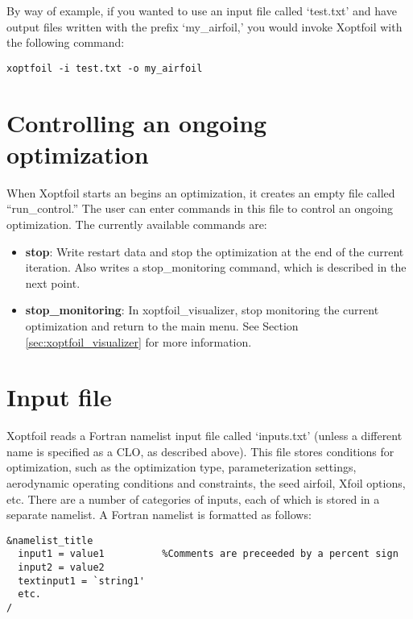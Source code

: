 \documentclass[11pt]{article}
\begin{document}
By way of example, if you wanted to use an input file called `test.txt' and have output
files written with the prefix `my\_airfoil,' you would invoke Xoptfoil with the following
command:

\begin{verbatim}
xoptfoil -i test.txt -o my_airfoil
\end{verbatim}

\section{Controlling an ongoing optimization}\label{sec:run_control}

When Xoptfoil starts an begins an optimization, it creates an empty file called
``run\_control.'' The user can enter commands in this file to control an ongoing
optimization. The currently available commands are:

\begin{itemize}
\item{\textbf{stop}: Write restart data and stop the optimization at the end of the
current iteration. Also writes a stop\_monitoring command, which is described in the next
point.}
\item{\textbf{stop\_monitoring}: In xoptfoil\_visualizer, stop monitoring the current
optimization and return to the main menu. See Section \ref{sec:xoptfoil_visualizer} for
more information.}
\end{itemize}

\section{Input file}

Xoptfoil reads a Fortran namelist input file called `inputs.txt' (unless a different name
is specified as a CLO, as described above).  This file stores
conditions for optimization, such as the optimization type, parameterization settings,
aerodynamic operating conditions and constraints, the seed airfoil, Xfoil options, etc.
There are a number of categories of inputs, each of which is stored in a separate
namelist.  A Fortran namelist is formatted as follows:

\begin{verbatim}
&namelist_title
  input1 = value1          %Comments are preceeded by a percent sign
  input2 = value2
  textinput1 = `string1'
  etc.
/
\end{verbatim}
\end{document}
